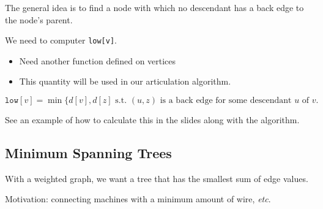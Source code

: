 \documentclass[12pt]{article}
\numberwithin{equation}{section}
\begin{document}
The general idea is to find a node with which no descendant has a back edge to
the node's parent.

We need to computer \texttt{low[v]}.
\begin{itemize}
	\item Need another function defined on vertices
	\item This quantity will be used in our articulation algorithm.
\end{itemize}

\begin{equation}
	\texttt{low}[v] = \min\{d[v],d[z] \text{ s.t. }  (u,z) \text{ is a back edge
	for some descendant $u$ of $v$.}
	\label{eq:low}
\end{equation}

See an example of how to calculate this in the slides along with the algorithm.

\subsection{Minimum Spanning Trees}

With a weighted graph, we want a tree that has the smallest sum of edge values.

Motivation: connecting machines with a minimum amount of wire, \textit{etc}.
\end{document}
